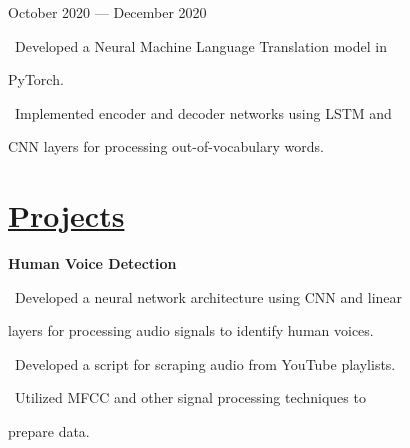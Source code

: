 \documentclass{article}
\begin{document}
\begin{minipage}[t]{0.45\textwidth\hspace{0in}}
\begin{minipage}[t]{3.75in\textwidth\hspace{0in}}
            \hspace{0.4em}\small\mdseries\textrm October 2020 — December 2020
            
            \small\mdseries
            \vspace{0.4em}
            \hspace{1em}\textasteriskcentered \, \mdseries\textrm{Developed a Neural Machine Language Translation model in} 
            
            \hspace{1.7em} PyTorch.
            
            \vspace{0.4em}
            \hspace{1em}\textasteriskcentered \, \mdseries\textrm{Implemented encoder and decoder networks using LSTM and}
            
            \hspace{1.7em} CNN layers for processing out-of-vocabulary words.
        \end{minipage}

        \section{\underline{Projects}}
        \begin{minipage}[t]{3.75in\textwidth\hspace{0in}}
            \mdseries\bfseries{Human Voice Detection}            
            
            \vspace{0.6em}
            \small\mdseries
            \hspace{1em}\textasteriskcentered \, \mdseries\textrm{Developed a neural network architecture using CNN and linear} 
            
            \hspace{2em}layers for processing audio signals to identify human voices.

            \vspace{0.6em}
            \hspace{1em}\textasteriskcentered \, \mdseries\textrm{Developed a script for scraping audio from YouTube playlists.}
            
            \vspace{0.6em}
            \hspace{1em}\textasteriskcentered \, \mdseries\textrm{Utilized MFCC and other signal processing techniques to} 
            
            \hspace{1.7em} prepare data.

        \end{minipage}

\end{minipage}
\end{document}
